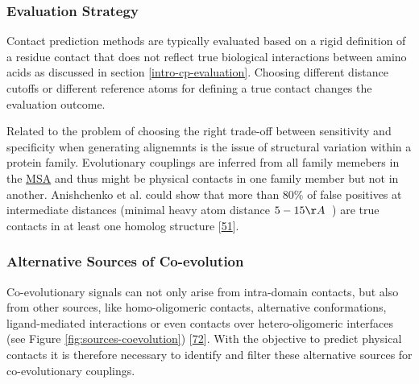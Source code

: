 \documentclass[12pt,a4paper,twoside]{book}
\theoremstyle{definition}
\theoremstyle{definition}
\theoremstyle{remark}
\begin{document}
\subsubsection*{Evaluation Strategy}\label{evaluation-strategy}

Contact prediction methods are typically evaluated based on a rigid
definition of a residue contact that does not reflect true biological
interactions between amino acids as discussed in section
\ref{intro-cp-evaluation}. Choosing different distance cutoffs or
different reference atoms for defining a true contact changes the
evaluation outcome.

Related to the problem of choosing the right trade-off between
sensitivity and specificity when generating alignemnts is the issue of
structural variation within a protein family. Evolutionary couplings are
inferred from all family memebers in the \protect\hyperlink{abbrev}{MSA}
and thus might be physical contacts in one family member but not in
another. Anishchenko et al. could show that more than \(80\%\) of false
positives at intermediate distances (minimal heavy atom distance
\(5-15 \AA \;\;\)) are true contacts in at least one homolog structure
{[}\protect\hyperlink{ref-Anishchenko2017}{51}{]}.

\subsubsection*{Alternative Sources of
Co-evolution}\label{alternative-sources-of-co-evolution}

Co-evolutionary signals can not only arise from intra-domain contacts,
but also from other sources, like homo-oligomeric contacts, alternative
conformations, ligand-mediated interactions or even contacts over
hetero-oligomeric interfaces (see Figure \ref{fig:sources-coevolution})
{[}\protect\hyperlink{ref-Marks2012}{72}{]}. With the objective to
predict physical contacts it is therefore necessary to identify and
filter these alternative sources for co-evolutionary couplings.
\end{document}
